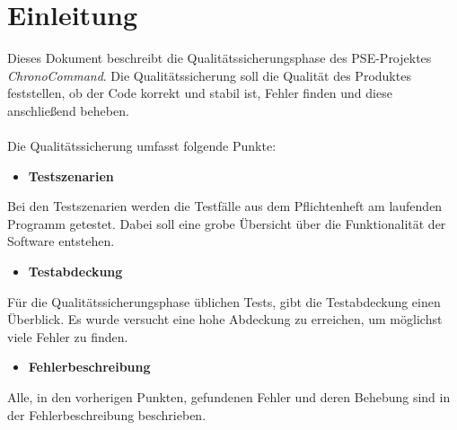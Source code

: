 \section{Einleitung}

Dieses Dokument beschreibt die Qualitätssicherungsphase des PSE-Projektes \linebreak \emph{ChronoCommand}. Die Qualitätssicherung soll die Qualität des Produktes feststellen, ob der Code korrekt und stabil ist, Fehler finden und diese anschließend beheben.
\\\\
Die Qualitätssicherung umfasst folgende Punkte:
\begin{itemize}
	\item \textbf{Testszenarien}
\end{itemize}
Bei den Testszenarien werden die Testfälle aus dem Pflichtenheft am laufenden Programm getestet. Dabei soll eine grobe Übersicht über die Funktionalität der Software entstehen.

\begin{itemize}
	\item \textbf{Testabdeckung}
\end{itemize}
Für die Qualitätssicherungsphase üblichen Tests, gibt die Testabdeckung einen Überblick. Es wurde versucht eine hohe Abdeckung zu erreichen, um möglichst viele Fehler zu finden.

\begin{itemize}
	\item \textbf{Fehlerbeschreibung}
\end{itemize}
Alle, in den vorherigen Punkten, gefundenen Fehler und deren Behebung sind in der Fehlerbeschreibung beschrieben. 
